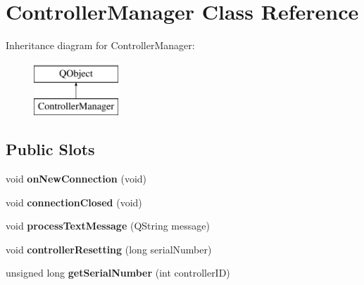 \hypertarget{class_controller_manager}{}\section{Controller\+Manager Class Reference}
\label{class_controller_manager}
Inheritance diagram for Controller\+Manager\+:\begin{figure}[H]
\begin{center}
\leavevmode
\includegraphics[height=2.000000cm]{class_controller_manager}
\end{center}
\end{figure}
\subsection*{Public Slots}
\begin{DoxyCompactItemize}
\item 
\mbox{\label{class_controller_manager_ae4af37bc85e3851255b952ae036e648a}} 
void {\bfseries on\+New\+Connection} (void)
\item 
\mbox{\label{class_controller_manager_a8022af93a94506e0b476d724c555410c}} 
void {\bfseries connection\+Closed} (void)
\item 
\mbox{\label{class_controller_manager_ac9328a72332f695b76cb03330b19f5bf}} 
void {\bfseries process\+Text\+Message} (Q\+String message)
\item 
\mbox{\label{class_controller_manager_a1caa6812a0791abb323df7297e872009}} 
void {\bfseries controller\+Resetting} (long serial\+Number)
\item 
\mbox{\label{class_controller_manager_a5b496ff2650f4048dc91de9cdeea43c8}} 
unsigned long {\bfseries get\+Serial\+Number} (int controller\+ID)
\end{DoxyCompactItemize}
